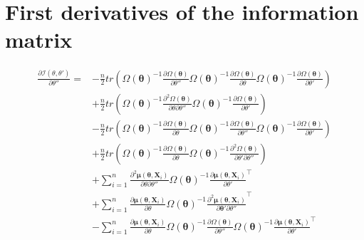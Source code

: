 \documentclass[table]{article}
\newcommand{\VX}{\boldsymbol{X}}
\newcommand{\Vmu}{\boldsymbol{\mu}}
\newcommand{\param}{\theta}
\newcommand{\Vparam}{\boldsymbol{\param}}
\newcommand\Information{\mathcal{I}}
\newcommand\dpartial[2]{\frac{\partial #1}{\partial #2}}
\newcommand\ddpartial[3]{\frac{\partial^2 #1}{\partial #2 \partial #3}}
\newcommand\trans[1]{{#1}^\intercal}%
\begin{document}
\section{First derivatives of the information matrix}
\label{sec:org27a8d69}
\begin{align*}
\frac{\partial \Information(\param,\param')}{\partial \param''} 
=& - \frac{n}{2} tr\left(\Omega(\Vparam)^{-1} \frac{\partial \Omega(\Vparam)}{\partial \param''} \Omega(\Vparam)^{-1} \frac{\partial \Omega(\Vparam)}{\partial \param} \Omega(\Vparam)^{-1} \frac{\partial \Omega(\Vparam)}{\partial \param'}\right) \\
& + \frac{n}{2} tr\left( \Omega(\Vparam)^{-1} \frac{\partial^2 \Omega(\Vparam)}{\partial\param\partial\param''} \Omega(\Vparam)^{-1} \frac{\partial \Omega(\Vparam)}{\partial \param'}\right) \\
& - \frac{n}{2} tr\left(\Omega(\Vparam)^{-1} \frac{\partial \Omega(\Vparam)}{\partial \param} \Omega(\Vparam)^{-1} \frac{\partial \Omega(\Vparam)}{\partial \param''} \Omega(\Vparam)^{-1} \frac{\partial \Omega(\Vparam)}{\partial \param'}\right) \\
& + \frac{n}{2} tr\left( \Omega(\Vparam)^{-1} \frac{\partial \Omega(\Vparam)}{\partial\param} \Omega(\Vparam)^{-1} \frac{\partial^2 \Omega(\Vparam)}{\partial \param' \partial \param''}\right) \\
& + \sum_{i=1}^n \frac{\partial^2 \Vmu(\Vparam,\VX_i)}{\partial\param\partial\param''} \Omega(\Vparam)^{-1} \trans{\dpartial{\Vmu(\Vparam,\VX_i)}{\param'}} \\
& + \sum_{i=1}^n \frac{\partial \Vmu(\Vparam,\VX_i)}{\partial \param} \Omega(\Vparam)^{-1} \trans{\ddpartial{\Vmu(\Vparam,\VX_i)}{\Vparam'}{\param''}} \\
& - \sum_{i=1}^n \frac{\partial \Vmu(\Vparam,\VX_i)}{\partial \param} \Omega(\Vparam)^{-1} \frac{\partial \Omega(\Vparam)}{\partial \param''} \Omega(\Vparam)^{-1} \trans{\dpartial{\Vmu(\Vparam,\VX_i)}{\param'}} \\
\end{align*}
\end{document}
